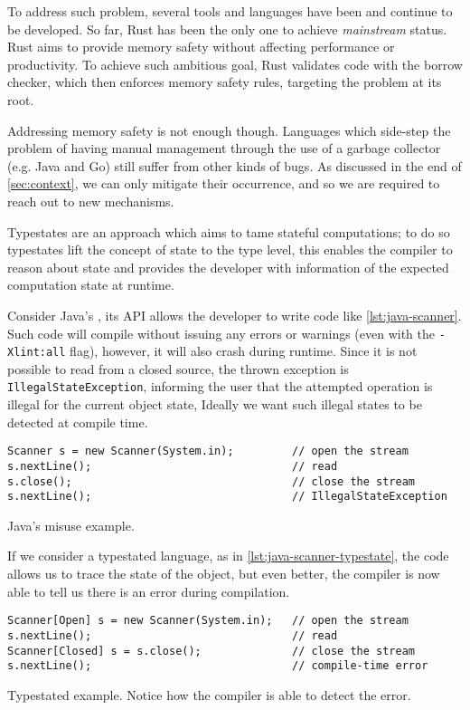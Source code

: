 To address such problem, several tools and languages have been and continue to be developed.
So far, Rust has been the only one to achieve \emph{mainstream} status.
Rust aims to provide memory safety without affecting performance or productivity.
To achieve such ambitious goal, Rust validates code with the borrow checker, which then enforces memory safety rules,
targeting the problem at its root.

Addressing memory safety is not enough though.
Languages which side-step the problem of having manual management
through the use of a garbage collector (e.g. Java and Go) still suffer from other kinds of bugs.
As discussed in the end of \autoref{sec:context}, we can only mitigate their occurrence, and
so we are required to reach out to new mechanisms.

Typestates are an approach which aims to tame stateful computations;
to do so typestates lift the concept of state to the type level,
this enables the compiler to reason about state and provides the developer
with information of the expected computation state at runtime.

Consider Java's , its API allows the developer to write code like \autoref{lst:java-scanner}.
Such code will compile without issuing any errors or warnings (even with the \texttt{-Xlint:all} flag),
however, it will also crash during runtime.
Since it is not possible to read from a closed source, the thrown exception is \texttt{IllegalStateException},
informing the user that the attempted operation is illegal for the current object state,
Ideally we want such illegal states to be detected at compile time.

\begin{listing}
    \begin{verbatim}
Scanner s = new Scanner(System.in);         // open the stream
s.nextLine();                               // read
s.close();                                  // close the stream
s.nextLine();                               // IllegalStateException
    \end{verbatim}
    \caption{Java's  misuse example.}
    \label{lst:java-scanner}
\end{listing}

If we consider a typestated language, as in \autoref{lst:java-scanner-typestate},
the code allows us to trace the state of the object, but even better,
the compiler is now able to tell us there is an error during compilation.

\begin{listing}
    \begin{verbatim}
Scanner[Open] s = new Scanner(System.in);   // open the stream
s.nextLine();                               // read
Scanner[Closed] s = s.close();              // close the stream
s.nextLine();                               // compile-time error
    \end{verbatim}
    \caption{
        Typestated  example.
        Notice how the compiler is able to detect the error.
    }
    \label{lst:java-scanner-typestate}
\end{listing}

